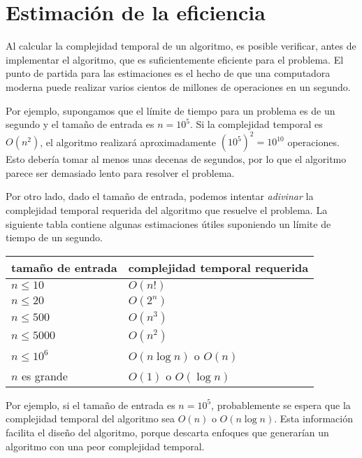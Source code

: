 \section{Estimación de la eficiencia}

Al calcular la complejidad temporal de un algoritmo,
es posible verificar, antes de
implementar el algoritmo, que es
suficientemente eficiente para el problema.
El punto de partida para las estimaciones es el hecho de que
una computadora moderna puede realizar varios cientos de
millones de operaciones en un segundo.

Por ejemplo, supongamos que el límite de tiempo para
un problema es de un segundo y el tamaño de entrada es $n=10^5$.
Si la complejidad temporal es $O(n^2)$,
el algoritmo realizará aproximadamente $(10^5)^2=10^{10}$ operaciones.
Esto debería tomar al menos unas decenas de segundos,
por lo que el algoritmo parece ser demasiado lento para resolver el problema.

Por otro lado, dado el tamaño de entrada,
podemos intentar \emph{adivinar}
la complejidad temporal requerida del algoritmo
que resuelve el problema.
La siguiente tabla contiene algunas estimaciones útiles
suponiendo un límite de tiempo de un segundo.

\begin{center}
    \begin{tabular}{ll}
        tamaño de entrada & complejidad temporal requerida \\
        \hline
        $n \le 10$        & $O(n!)$                        \\
        $n \le 20$        & $O(2^n)$                       \\
        $n \le 500$       & $O(n^3)$                       \\
        $n \le 5000$      & $O(n^2)$                       \\
        $n \le 10^6$      & $O(n \log n)$ o $O(n)$         \\
        $n$ es grande     & $O(1)$ o $O(\log n)$           \\
    \end{tabular}
\end{center}

Por ejemplo, si el tamaño de entrada es $n=10^5$,
probablemente se espera que la complejidad
temporal del algoritmo sea $O(n)$ o $O(n \log n)$.
Esta información facilita el diseño del algoritmo,
porque descarta enfoques que generarían
un algoritmo con una peor complejidad temporal.

